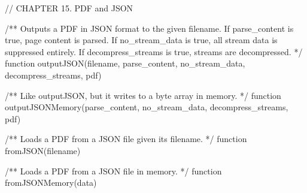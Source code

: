 // CHAPTER 15. PDF and JSON

/** Outputs a PDF in JSON format to the given filename. If parse_content is
true, page content is parsed. If no_stream_data is true, all stream data is
suppressed entirely. If decompress_streams is true, streams are decompressed. */
function outputJSON(filename, parse_content, no_stream_data, decompress_streams, pdf)

/** Like outputJSON, but it writes to a byte array in memory. */
function outputJSONMemory(parse_content, no_stream_data, decompress_streams, pdf)

/** Loads a PDF from a JSON file given its filename. */
function fromJSON(filename)

/** Loads a PDF from a JSON file in memory. */
function fromJSONMemory(data)
